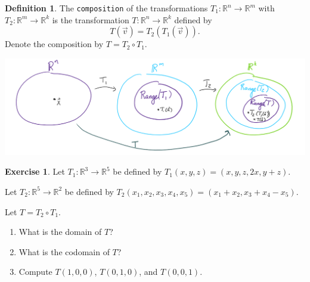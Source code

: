 \documentclass{beamer}
\newcommand{\R}{\mathbb{R}}
\newcommand{\fn}{\insertframenumber}
\theoremstyle{definition}
\newtheorem{exercise}{Exercise}
\newtheorem*{defn}{Definition}
\renewcommand{\emph}[1]{{\color{blue}\texttt{#1}}}
\begin{document}
\begin{frame}{\fn}
	\begin{defn}
		The \emph{composition} of the transformations $T_1\colon \R^n\to \R^m$ with $T_2\colon \R^m\to\R^k$ is the transformation $T\colon \R^n\to\R^k$ defined by 
			\[T(\vec v)=T_2(T_1(\vec v)).\]
		Denote the composition by $T=T_2\circ T_1$.
		\begin{center}
			\includegraphics[width=.9\textwidth]{images/composition}
		\end{center}
	\end{defn}
\end{frame}
\begin{frame}{\fn}
	\begin{exercise}
		Let $T_1:\R^3\to\R^5$  be defined by $T_1(x,y,z)=(x,y,z,2x,y+z)$.
		
		Let $T_2:\R^5\to\R^2$ be defined by $T_2(x_1,x_2,x_3,x_4,x_5)=(x_1+x_2,x_3+x_4-x_5)$.
		
		Let $T=T_2\circ T_1$.  
		\begin{enumerate}[label=(\alph*)]
			\item What is the domain of $T$?  
			\item What is the codomain of $T$?
			\item Compute $T(1,0,0)$, $T(0,1,0)$, and $T(0,0,1)$.
		\end{enumerate}
	\end{exercise}
\end{frame}
\end{document}
